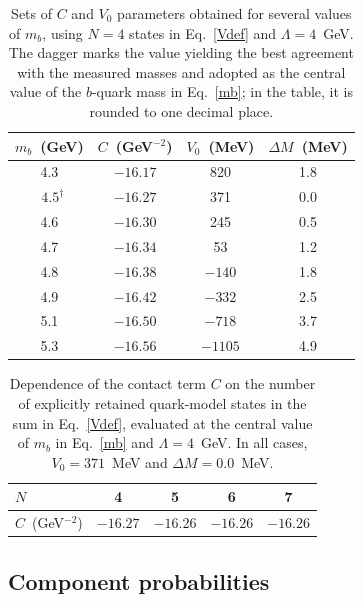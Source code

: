 \documentclass[aps,prd,showpacs,amsmath,twocolumn,superscriptaddress,floatfix,nofootinbib,notitlepage]{revtex4-2}
\newcommand{\unit}[1]{~(#1)}
\begin{document}
\begin{table}[t!]
\centering
\caption{Sets of $C$ and $V_0$ parameters obtained for several values of $m_b$, using $N=4$ states in Eq.~\eqref{Vdef} and $\Lambda=4$~GeV. The dagger marks the value yielding the best agreement with the measured masses and adopted as the central value of the $b$-quark mass in Eq.~\eqref{mb}; in the table, it is rounded to one decimal place. 
}
\label{tab:parameters2}
\begin{ruledtabular}
\begin{tabular}{cccc}
$m_b$\unit{GeV} & $C$\unit{GeV$^{-2}$} & $V_0$\unit{MeV} & $\Delta M$\unit{MeV} \\
\hline
4.3 & $-16.17$ & 820 & 1.8 \\
~$4.5^\dagger$ & $-16.27$ & 371 & 0.0 \\
4.6 & $-16.30$ & 245 & 0.5 \\
4.7 & $-16.34$ & 53 & 1.2 \\
4.8 & $-16.38$ & $-140$ & 1.8 \\
4.9 & $-16.42$ & $-332$ & 2.5 \\
5.1 & $-16.50$ & $-718$ & 3.7 \\
5.3 & $-16.56$ & $-1105$ & 4.9 \\
\end{tabular}
\end{ruledtabular}
\end{table}

\begin{table}[t!]
\centering
\caption{Dependence of the contact term $C$ on the number of explicitly retained quark-model states in the sum in Eq.~\eqref{Vdef}, evaluated at the central value of $m_b$ in Eq.~\eqref{mb} and $\Lambda=4$~GeV. In all cases, $V_0=371$~MeV and $\Delta M=0.0$~MeV.
}
\label{tab:parametersN}
\begin{ruledtabular}
\begin{tabular}{l|cccc}
$N$ & 4 & 5 & 6 & 7 \\
\hline
$C$\unit{GeV$^{-2}$} & $-16.27$ & $-16.26$ & $-16.26$ & $-16.26$
\end{tabular}
\end{ruledtabular}
\end{table}

\subsection{Component probabilities}
\label{sec:probabilities}
\end{document}
